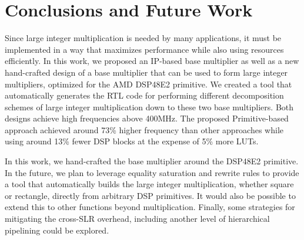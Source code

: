 \documentclass[conference]{IEEEtran}
\begin{document}



% 


\section{Conclusions and Future Work}
Since large integer multiplication is needed by many applications, it must be implemented in a way that maximizes performance while also using resources efficiently.  
In this work, we proposed an IP-based base multiplier as well as a new hand-crafted design of a base multiplier that can be used to form large integer multipliers, optimized for the AMD DSP48E2 primitive. 
We created a tool that automatically generates the RTL code for performing different decomposition schemes of large integer multiplication down to these two base multipliers. 
Both designs achieve high frequencies above 400MHz.
The proposed Primitive-based approach achieved around 73\% higher frequency than other approaches while using around 13\% fewer DSP blocks at the expense of 5\% more LUTs. 

In this work, we hand-crafted the base multiplier around the DSP48E2 primitive. 
In the future, we plan to leverage equality saturation and rewrite rules to provide a tool that automatically builds the large integer multiplication, whether square or rectangle, directly from arbitrary DSP primitives.
It would also be possible to extend this to other functions beyond multiplication. 
Finally, some strategies for mitigating the cross-SLR overhead, including another level of hierarchical pipelining could be explored.






\end{document}
